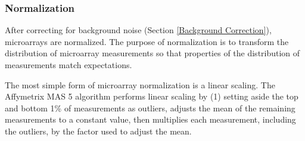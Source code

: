 %

\subsubsection{Normalization}
\label{Normalization}

After correcting for background noise (Section \ref{Background Correction}),
microarrays are normalized.  The purpose of normalization is to transform the
distribution of microarray measurements so that properties of the
distribution of measurements match expectations.

The most simple form of microarray normalization is a linear scaling.  The
Affymetrix MAS 5 algorithm \cite{mas5} performs linear scaling by (1) setting
aside the top and bottom 1\% of measurements as outliers, adjusts the mean of
the remaining measurements to a constant value, then multiplies each
measurement, including the outliers, by the factor used to adjust the mean.


